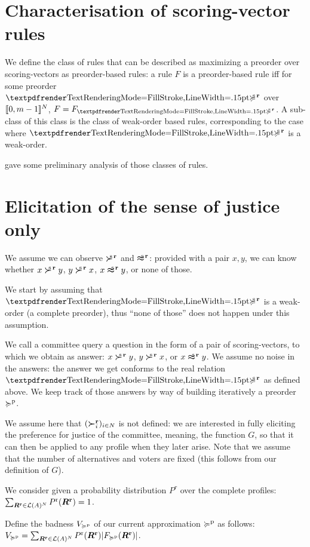 \documentclass[version=last, pagesize, twoside=off, bibliography=totoc, DIV=calc, fontsize=14pt, a4paper, french, english]{scrartcl}
\begin{document}
\section{Characterisation of scoring-vector rules}
We define the class of rules that can be described as maximizing a preorder over scoring-vectors as preorder-based rules: a rule $F$ is a preorder-based rule iff for some preorder $\prefsv$ over $\lbrack\!\lbrack{}0, m-1\rbrack\!\rbrack^N$, $F = F_{\prefsv}$. A sub-class of this class is the class of weak-order based rules, corresponding to the case where $\prefsv$ is a weak-order.

\citet{cailloux_eliciting_2014} gave some preliminary analysis of those classes of rules.


\section{Elicitation of the sense of justice only}
We assume we can observe $\mathrel{\boldsymbol{\succ}^{\text{\!\!\!s}\textbf{\,r}}}$ and $\mathrel{\boldsymbol{\approx}^{\text{\!\!\!s}\textbf{\,r}}}$: provided with a pair $x, y$, we can know whether $x \mathrel{\boldsymbol{\succ}^{\text{\!\!\!s}\textbf{\,r}}} y$, $y \mathrel{\boldsymbol{\succ}^{\text{\!\!\!s}\textbf{\,r}}} x$, $x \mathrel{\boldsymbol{\approx}^{\text{\!\!\!s}\textbf{\,r}}} y$, or none of those.

We start by assuming that $\prefsv$ is a weak-order (a complete preorder), thus “none of those” does not happen under this assumption.

We call a committee query a question in the form of a pair of scoring-vectors, to which we obtain as answer: $x \mathrel{\boldsymbol{\succ}^{\text{\!\!\!s}\textbf{\,r}}} y$, $y \mathrel{\boldsymbol{\succ}^{\text{\!\!\!s}\textbf{\,r}}} x$, or $x \mathrel{\boldsymbol{\approx}^{\text{\!\!\!s}\textbf{\,r}}} y$. We assume no noise in the answers: the answer we get conforms to the real relation $\prefsv$ as defined above.
We keep track of those answers by way of building iteratively a preorder $\succcurlyeq^\text{p}$.

We assume here that $(\boldsymbol{\succ}^\textbf{r}_i)_{i \in N}$ is not defined: we are interested in fully eliciting the preference for justice of the committee, meaning, the function $G$, so that it can then be applied to any profile when they later arise. Note that we assume that the number of alternatives and voters are fixed (this follows from our definition of $G$).

We consider given a probability distribution $P^r$ over the complete profiles: $\sum_{\boldsymbol{R}^\textbf{r} \in \mathcal{L}(A)^N} P^\text{r}(\boldsymbol{R}^\textbf{r}) = 1$.

Define the badness $V_{\succcurlyeq^\text{p}}$ of our current approximation $\succcurlyeq^\text{p}$ as follows: $V_{\succcurlyeq^\text{p}} = \sum_{\boldsymbol{R}^\textbf{r} \in \mathcal{L}(A)^N} P^\text{r}(\boldsymbol{R}^\textbf{r}) \lvert{F_{\succcurlyeq^\text{p}}(\boldsymbol{R}^\textbf{r})}\rvert$.
\end{document}
